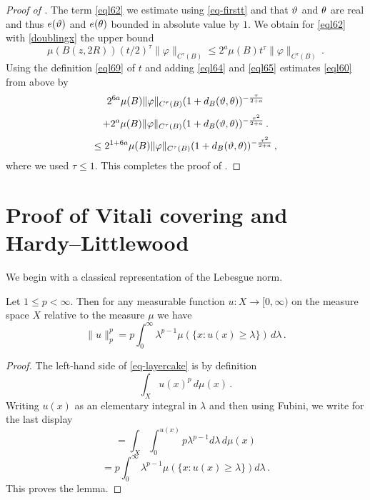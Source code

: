 \begin{proof}[Proof of ]
The term \eqref{eql62} we estimate using
\eqref{eq-firstt} and that
${\vartheta}$ and ${\theta}$ are real and thus $e({\vartheta})$ and
$e({\theta})$ bounded in absolute value by $1$.
We obtain for \eqref{eql62} with \eqref{doublingx}
the upper bound
  \begin{equation}\label{eql65}
      \mu(B(z,2R)) (t/2)^{\tau} \|\varphi\|_{C^\tau(B)}
      \le 2^a \mu(B) t^{\tau} \|\varphi\|_{C^\tau(B)}
      \,.
 \end{equation}
Using the definition \eqref{eql69} of $t$ and adding
\eqref{eql64} and \eqref{eql65} estimates
\eqref{eql60} from above by
\begin{equation}
       2^{6a} \mu(B) \|{\varphi}\|_{C^\tau(B)}
       (1 + d_{B}({\vartheta},{\theta}))^{-\frac{\tau}{2+a}}
       \end{equation}
\begin{equation} +
        2^a \mu(B) \|{\varphi}\|_{C^\tau(B)}
       (1 + d_{B}({\vartheta},{\theta}))^{-\frac{\tau^2}{2+a}}\, .
 \end{equation}
\begin{equation}\label{eql66}
      \le 2^{1+6a} \mu(B) \|{\varphi}\|_{C^\tau(B)}
       (1 + d_{B}({\vartheta},{\theta}))^{-\frac{\tau^2}{2+a}} \, ,
 \end{equation}
where we used $\tau\le 1$.
This completes the proof of .
\end{proof}

\chapter{Proof of Vitali covering and Hardy--Littlewood}
\label{sec-hlm}


We begin with a classical representation of the Lebesgue norm.
\begin{lemma}\label{layer-cake-representation}
\leanok
{}
Let $1\le p< \infty$. Then for any measurable function $u:X\to [0,\infty)$ on the measure space $X$
relative to the measure $\mu$
we have
\begin{equation}\label{eq-layercake}
    \|u\|_p^p=p\int_0^\infty \lambda^{p-1}\mu(\{x: u(x)\ge \lambda\})\, d\lambda\, .
\end{equation}
\end{lemma}
\begin{proof}
    \leanok
    The left-hand side of \eqref{eq-layercake} is by definition
\begin{equation}
    \int_X u(x)^p \, d\mu(x)\, .\end{equation}
    Writing $u(x)$ as an elementary integral in $\lambda$ and then using Fubini, we write for the last display
    \begin{equation}
    =\int_X \int _0^{u(x)}
    p \lambda^{p-1} d\lambda\, d\mu(x)
\end{equation}
\begin{equation}
 =p\int _0^{\infty}
    \lambda^{p-1} \mu(\{x: u(x)\ge \lambda\}) d\lambda\, .
\end{equation}
This proves the lemma.
\end{proof}

